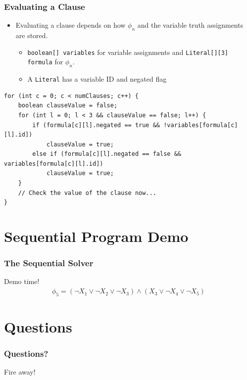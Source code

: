 \documentclass[handout]{beamer}
\begin{document}
\begin{frame}[fragile]
	\frametitle{Evaluating a Clause}
\begin{itemize}
	\item Evaluating a clause depends on how $\phi_n$ and the variable truth assignments are stored.
	\begin{itemize}
		\item {\tt boolean[] variables} for variable assignments and {\tt Literal[][3] formula} for $\phi_n$.
		\item A {\tt Literal} has a variable ID and negated flag
	\end{itemize}
\end{itemize}
{\small
\begin{lstlisting}
for (int c = 0; c < numClauses; c++) {
    boolean clauseValue = false;
    for (int l = 0; l < 3 && clauseValue == false; l++) {
        if (formula[c][l].negated == true && !variables[formula[c][l].id])
            clauseValue = true;
        else if (formula[c][l].negated == false && variables[formula[c][l].id])
            clauseValue = true; 
    }
    // Check the value of the clause now...
}
\end{lstlisting}
}
\end{frame}

\section{Sequential Program Demo}
\begin{frame}
	\frametitle{The Sequential Solver}
	\begin{center}
		Demo time!
		\begin{align*}
			\phi_5 = (\lnot X_1 \lor \lnot X_2 \lor \lnot X_3) \land (X_3 \lor \lnot X_4 \lor \lnot X_5)
		\end{align*}
	\end{center}
\end{frame}

\section{Questions}
\begin{frame}
	\frametitle{Questions?}
	\begin{center}
		Fire away!
	\end{center}
\end{frame}

%	
%	

\end{document}
